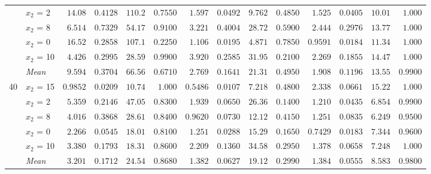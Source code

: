 \begin{table}[htbp]
\begin{tabular}{llrrrrrrrrrrrr}
 & $x_2$ = 2 & $14.08$ & $0.4128$ & $110.2$ & $0.7550$ & $1.597$ & $0.0492$ & {\boldmath$9.762$} & $0.4850$ & {\boldmath$1.525$} & {\boldmath$0.0405$} & $10.01$ & {\boldmath$1.000$} \\
 & $x_2$ = 8 & $6.514$ & $0.7329$ & $54.17$ & {\boldmath$0.9100$} & $3.221$ & $0.4004$ & $28.72$ & $0.5900$ & {\boldmath$2.444$} & {\boldmath$0.2976$} & {\boldmath$13.77$} & $1.000$ \\
 & $x_2$ = 0 & $16.52$ & $0.2858$ & $107.1$ & $0.2250$ & $1.106$ & $0.0195$ & {\boldmath$4.871$} & $0.7850$ & {\boldmath$0.9591$} & {\boldmath$0.0184$} & $11.34$ & {\boldmath$1.000$} \\
 & $x_2$ = 10 & $4.426$ & $0.2995$ & $28.59$ & {\boldmath$0.9900$} & $3.920$ & $0.2585$ & $31.95$ & $0.2100$ & {\boldmath$2.269$} & {\boldmath$0.1855$} & {\boldmath$14.47$} & $1.000$ \\
 & \textit{Mean} & $9.594$ & $0.3704$ & $66.56$ & $0.6710$ & $2.769$ & $0.1641$ & $21.31$ & $0.4950$ & \colorbox{green!20}{\boldmath$1.908$} & \colorbox{green!20}{\boldmath$0.1196$} & \colorbox{green!20}{\boldmath$13.55$} & \colorbox{green!20}{\boldmath$0.9900$} \\
\midrule
\multirow{6}{*}{40} & $x_2$ = 15 & $0.9852$ & $0.0209$ & $10.74$ & {\boldmath$1.000$} & {\boldmath$0.5486$} & {\boldmath$0.0107$} & {\boldmath$7.218$} & $0.4800$ & $2.338$ & $0.0661$ & $15.22$ & $1.000$ \\
 & $x_2$ = 2 & $5.359$ & $0.2146$ & $47.05$ & {\boldmath$0.8300$} & $1.939$ & $0.0650$ & $26.36$ & $0.1400$ & {\boldmath$1.210$} & {\boldmath$0.0435$} & {\boldmath$6.854$} & $0.9900$ \\
 & $x_2$ = 8 & $4.016$ & $0.3868$ & $28.61$ & $0.8400$ & {\boldmath$0.9620$} & {\boldmath$0.0730$} & $12.12$ & $0.4150$ & $1.251$ & $0.0835$ & {\boldmath$6.249$} & {\boldmath$0.9500$} \\
 & $x_2$ = 0 & $2.266$ & $0.0545$ & $18.01$ & $0.8100$ & $1.251$ & $0.0288$ & $15.29$ & $0.1650$ & {\boldmath$0.7429$} & {\boldmath$0.0183$} & {\boldmath$7.344$} & {\boldmath$0.9600$} \\
 & $x_2$ = 10 & $3.380$ & $0.1793$ & $18.31$ & {\boldmath$0.8600$} & $2.209$ & $0.1360$ & $34.58$ & $0.2950$ & {\boldmath$1.378$} & {\boldmath$0.0658$} & {\boldmath$7.248$} & $1.000$ \\
 & \textit{Mean} & $3.201$ & $0.1712$ & $24.54$ & \colorbox{green!20}{\boldmath$0.8680$} & \colorbox{green!20}{\boldmath$1.382$} & $0.0627$ & $19.12$ & $0.2990$ & $1.384$ & \colorbox{green!20}{\boldmath$0.0555$} & \colorbox{green!20}{\boldmath$8.583$} & $0.9800$ \\
\bottomrule
\end{tabular}
\end{table}
